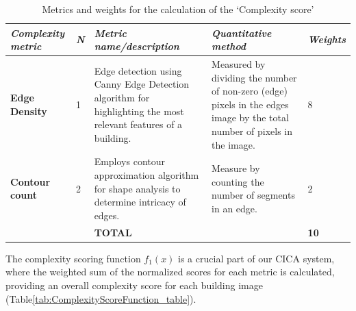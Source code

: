     \begin{table}[htb]
        \centering
        \small
        \caption{Metrics and weights for the calculation of the `Complexity score'}
        \label{tab:MetricsandWeights}
        \begin{tabularx}{\textwidth}{p{3.5cm} p{1cm} X X p{1cm}}
            \toprule
            \textit{Complexity metric} &
              \textit{N} &
              \textit{Metric name/description} &
              \textit{Quantitative   method} &
              \textit{Weights} \\ \midrule
            \textbf{Edge Density} &
              1 &
              Edge detection using Canny Edge Detection algorithm for highlighting the most relevant features of a building.
                &
              Measured by dividing the number of non-zero (edge) pixels in the edges image by the total number of pixels in the image.
                &
              8\\
            \textbf{Contour count} &
              2 &
              Employs contour approximation algorithm for shape analysis to determine intricacy of edges.
                &
              Measure by counting the number of segments in an edge.
                &
              2\\ \bottomrule
               &
               &
              \textbf{TOTAL} &
              &
              \textbf{10}\\ \bottomrule
        \end{tabularx}
    \end{table}

The complexity scoring function \(f_1(x)\) is a crucial part of our CICA system, where the weighted sum of the normalized scores for each metric is calculated, providing an overall complexity score for each building image (Table\ref{tab:ComplexityScoreFunction_table}).

